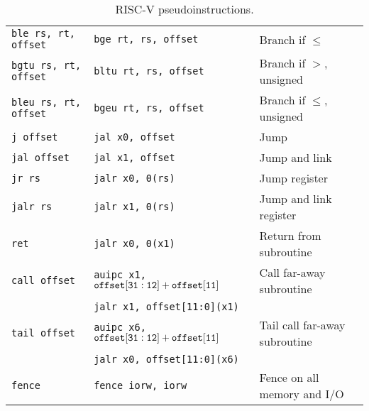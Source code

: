 \begin{table}[h]
\begin{small}
\begin{center}
\begin{tabular}{l l l}
{\tt ble rs, rt, offset} & {\tt bge rt, rs, offset} & Branch if $\leq$ \\
{\tt bgtu rs, rt, offset} & {\tt bltu rt, rs, offset} & Branch if $>$, unsigned \\
{\tt bleu rs, rt, offset} & {\tt bgeu rt, rs, offset} & Branch if $\leq$, unsigned \\
\hline
{\tt j offset} & {\tt jal x0, offset} & Jump \\
{\tt jal offset} & {\tt jal x1, offset} & Jump and link \\
{\tt jr rs} & {\tt jalr x0, 0(rs)} & Jump register \\
{\tt jalr rs} & {\tt jalr x1, 0(rs)} & Jump and link register \\
{\tt ret} & {\tt jalr x0, 0(x1)} & Return from subroutine \\
\tt call offset & {\tt auipc x1, ${\tt offset[31:12]} + {\tt offset[11]}$} & Call far-away subroutine \\
                & {\tt jalr x1, offset[11:0](x1)}                          & \\
\tt tail offset & {\tt auipc x6, ${\tt offset[31:12]} + {\tt offset[11]}$} & Tail call far-away subroutine \\
                & {\tt jalr x0, offset[11:0](x6)}                          & \\
\hline
{\tt fence} & {\tt fence iorw, iorw} & Fence on all memory and I/O \\
\hline

\end{tabular}
\end{center}
\end{small}
\caption{RISC-V pseudoinstructions.}
\label{pseudos}
\end{table}

